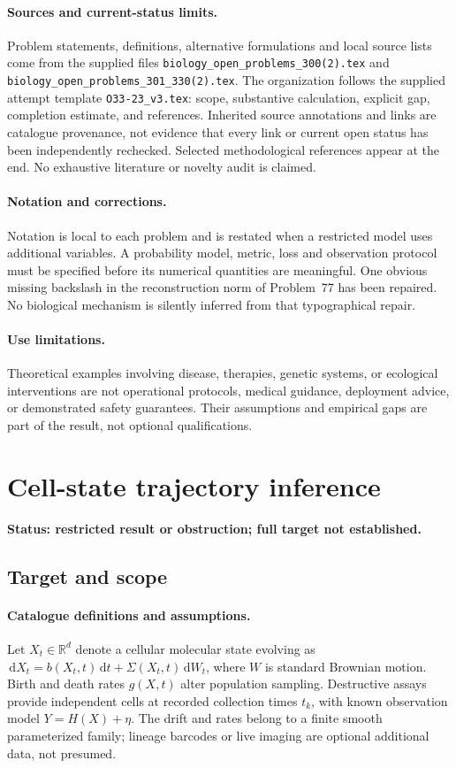 \documentclass[11pt]{article}
\begin{document}
\paragraph{Sources and current-status limits.}
Problem statements, definitions, alternative formulations and local source lists
come from the supplied files
\texttt{biology\_open\_problems\_300(2).tex} and
\texttt{biology\_open\_problems\_301\_330(2).tex}.
The organization follows the supplied attempt template
\texttt{O33-23\_v3.tex}: scope, substantive calculation, explicit gap,
completion estimate, and references. Inherited source annotations and links are
catalogue provenance, not evidence that every link or current open status has
been independently rechecked. Selected methodological references appear at the
end. No exhaustive literature or novelty audit is claimed.

\paragraph{Notation and corrections.}
Notation is local to each problem and is restated when a restricted model uses
additional variables. A probability model, metric, loss and observation protocol
must be specified before its numerical quantities are meaningful. One obvious
missing backslash in the reconstruction norm of Problem~77 has been repaired.
No biological mechanism is silently inferred from that typographical repair.

\paragraph{Use limitations.}
Theoretical examples involving disease, therapies, genetic systems, or ecological
interventions are not operational protocols, medical guidance, deployment advice,
or demonstrated safety guarantees. Their assumptions and empirical gaps are part
of the result, not optional qualifications.


\section*{Cell-state trajectory inference}
\label{prob:071}
\noindent\textbf{Status: restricted result or obstruction; full target not established.}
\subsection{Target and scope}
\paragraph{Catalogue definitions and assumptions.}
Let $X_t\in\mathbb{R}^d$ denote a cellular molecular state evolving as $\,\mathrm{d} X_t=b(X_t,t)\,\mathrm{d} t+\Sigma(X_t,t)\,\mathrm{d} W_t$, where $W$ is standard Brownian motion. Birth and death rates $g(X,t)$ alter population sampling. Destructive assays provide independent cells at recorded collection times $t_k$, with known observation model $Y=H(X)+\eta$. The drift and rates belong to a finite smooth parameterized family; lineage barcodes or live imaging are optional additional data, not presumed.
\end{document}
